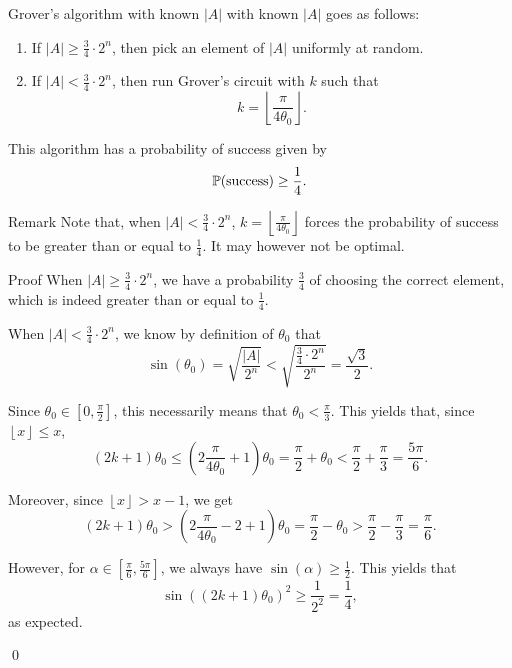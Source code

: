 \documentclass[a4paper]{article}
\begin{document}
\begin{parag}{Grover's algorithm with known $\left|A\right|$}
     with known $\left|A\right|$ goes as follows:
    \begin{enumerate}
        \item If $\left|A\right| \geq \frac{3}{4}\cdot  2^n$, then pick an element of $\left|A\right|$ uniformly at random.
        \item If $\left|A\right| < \frac{3}{4}\cdot 2^n$, then run Grover's circuit with $k$ such that 
        \[k = \left\lfloor \frac{\pi}{4 \theta_0} \right\rfloor.\]
    \end{enumerate}

    This algorithm has a probability of success given by
    \[\prob\left(\text{success}\right) \geq \frac{1}{4}.\]

    \begin{subparag}{Remark}
        Note that, when $\left|A\right| < \frac{3}{4}\cdot  2^n$, $k = \left\lfloor \frac{\pi}{4 \theta_0} \right\rfloor$ forces the probability of success to be greater than or equal to $\frac{1}{4}$. It may however not be optimal.
    \end{subparag}
    
    \begin{subparag}{Proof}
        When $\left|A\right| \geq \frac{3}{4}\cdot 2^n$, we have a probability $\frac{3}{4}$ of choosing the correct element, which is indeed greater than or equal to $\frac{1}{4}$.

        When $\left|A\right| < \frac{3}{4} \cdot 2^n$, we know by definition of $\theta_0$ that 
        \[\sin\left(\theta_0\right) = \sqrt{\frac{\left|A\right|}{2^n}} < \sqrt{\frac{\frac{3}{4}\cdot  2^n}{2^n}} = \frac{\sqrt{3}}{2}.\]

        Since $\theta_0 \in \left[0, \frac{\pi}{2}\right]$, this necessarily means that $\theta_0 < \frac{\pi}{3}$. This yields that, since $\left\lfloor x \right\rfloor \leq x$,
        \[\left(2k + 1\right) \theta_0 \leq \left(2 \frac{\pi}{4 \theta_0}  + 1\right) \theta_0 = \frac{\pi}{2} + \theta_0 < \frac{\pi}{2} + \frac{\pi}{3} = \frac{5\pi}{6}.\]

        Moreover, since $\left\lfloor x \right\rfloor > x - 1$, we get
        \[\left(2k + 1\right) \theta_0 > \left(2 \frac{\pi}{4 \theta_0} - 2 + 1\right) \theta_0 = \frac{\pi}{2} - \theta_0 > \frac{\pi}{2} - \frac{\pi}{3} = \frac{\pi}{6}.\]

        However, for $\alpha \in \left[\frac{\pi}{6}, \frac{5\pi}{6}\right]$, we always have $\sin\left(\alpha\right) \geq \frac{1}{2}$. This yields that 
        \[\sin\left(\left(2k + 1\right) \theta_0\right)^2 \geq \frac{1}{2^2} = \frac{1}{4},\]
        as expected.

        \qed
   \end{subparag}
\end{parag}
\end{document}
